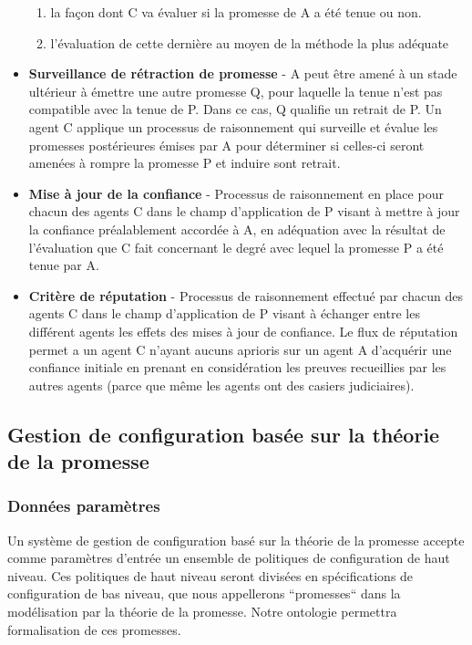 \begin{itemize}
  	\begin{enumerate}
	  \item la façon dont C va évaluer si la promesse de A a été tenue ou
		  non.
      \item l'évaluation de cette dernière au moyen de la méthode la plus
          adéquate
  	\end{enumerate}
  \item \textbf{Surveillance de rétraction de promesse} -
	A peut être amené à un stade ultérieur à émettre une autre promesse Q,
	pour laquelle la tenue n'est pas compatible avec la tenue de P. Dans ce
	cas, Q qualifie un retrait de P. Un agent C applique un processus de
	raisonnement qui surveille et évalue les promesses postérieures émises
	par A pour déterminer si celles-ci seront amenées à rompre la promesse P
	et induire sont retrait.
  \item \textbf{Mise à jour de la confiance} -
	Processus de raisonnement en place pour chacun des agents C dans le champ
	d'application de P visant à mettre à jour la confiance préalablement
	accordée à A, en adéquation avec la résultat de l'évaluation que C fait
	concernant le degré avec lequel la promesse P a été tenue par A.
  \item \textbf{Critère de réputation} -
	Processus de raisonnement effectué par chacun des agents C dans le champ
	d'application de P visant à échanger entre les différent agents les
	effets des mises à jour de confiance. Le flux de réputation permet a un
	agent C n'ayant aucuns aprioris sur un agent A d'acquérir une confiance
	initiale en prenant en considération les preuves recueillies par les
    autres agents (parce que même les agents ont des casiers judiciaires).
\end{itemize}

\subsection{Gestion de configuration basée sur la théorie de la promesse}

\subsubsection{Données paramètres}

Un système de gestion de configuration basé sur la théorie de la promesse
accepte comme paramètres d'entrée un ensemble de politiques de configuration de
haut niveau. Ces politiques de haut niveau seront divisées en spécifications de
configuration de bas niveau, que nous appellerons ``promesses`` dans la
modélisation par la théorie de la promesse. Notre ontologie permettra
formalisation de ces promesses.

